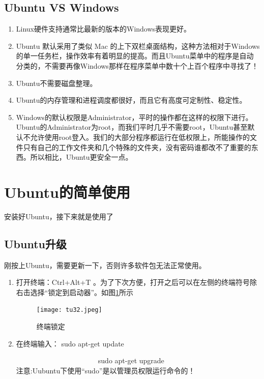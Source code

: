\documentclass{article}
\begin{document}
\subsection{Ubuntu VS Windows}
\begin{enumerate}
\item Linux硬件支持通常比最新的版本的Windows表现更好。

\item Ubuntu 默认采用了类似 Mac 的上下双栏桌面结构，这种方法相对于Windows的单一任务栏，操作效率有着明显的提高。而且Ubuntu菜单中的程序是自动分类的，不需要再像Windows那样在程序菜单中数十个上百个程序中寻找了！

\item Ubuntu不需要磁盘整理。

\item Ubuntu的内存管理和进程调度都很好，而且它有高度可定制性、稳定性。

\item Windows的默认权限是Administrator，平时的操作都在这样的权限下进行。Ubuntu的Administrator为root，而我们平时几乎不需要root，Ubuntu甚至默认不允许使用root登入。我们的大部分程序都运行在低权限上，所能操作的文件只有自己的工作文件夹和几个特殊的文件夹，没有密码谁都改不了重要的东西。所以相比，Ubuntu更安全一点。
\end{enumerate}
\section{Ubuntu的简单使用}
 安装好Ubuntu，接下来就是使用了
\subsection{Ubuntu升级}
  刚按上Ubuntu，需要更新一下，否则许多软件包无法正常使用。
\begin{enumerate}
\item 打开终端：Ctrl+Alt+T 。为了下次方便，打开之后可以在左侧的终端符号除右击选择“锁定到启动器”。如图\ref{tu32}所示

\begin{figure}[!htb] %
\centering
\texttt{[image: tu32.jpeg]}
\caption{\small 终端锁定}
\label{tu32}
\end{figure} 

 \item 在终端输入： sudo apt-get update

~~~~~~~~~~~~~~~~~~~~~~~sudo apt-get upgrade\\
{\color{red}注意:}Uubuntu下使用{\color{red}“sudo”}是以管理员权限运行命令的！
\end{enumerate}
\end{document}
